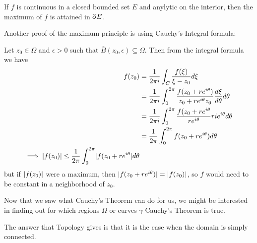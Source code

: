 \begin{corollary}[]
If $f$ is continuous in a closed bounded set $E$ and anylytic on the interior, then the maximum of $f$ is attained in $\partial E$.
\end{corollary}

Another proof of the maximum principle is using Cauchy's Integral formula:

Let $z_0 \in \Omega$ and $\epsilon > 0$ such that $\overline{B}(z_0,\epsilon) \subseteq \Omega$. Then from the integral formula we have
\begin{align*}
	f(z_0) &= \frac{1}{2\pi i}\int_C \frac{f(\xi)}{\xi - z_0}d\xi\\
				 &= \frac{1}{2\pi i} \int_{0}^{2\pi} \frac{f(z_0 + re^{i\theta})}{z_0 + r e^{i\theta} z_0} \frac{d\xi}{d \theta} d \theta \\
				 &=	\frac{1}{2\pi i} \int_{0}^{2\pi} \frac{f(z_0 + re^{i\theta}}{re^{i \theta}} ri e^{i \theta} d \theta \\
				 &= \frac{1}{2\pi} \int_{0}^{2\pi} f(z_0 + re^{i \theta}) d \theta\\
			 \implies \abs{f(z_0)} \leq \frac{1}{2\pi} \int_{0}^{2 \pi} \abs{f(z_0 + re^{i \theta}} d \theta
\end{align*}
but if $\vert f(z_0)\vert$ were a maximum, then $\vert f(z_0 + re^{i \theta})\vert = \vert f(z_0)\vert$, so $f$ would need to be constant in a neighborhood of $z_0$.

Now that we saw what Cauchy's Theorem can do for us, we might be interested in finding out for which regions $\Omega$ or curves $\gamma$ Cauchy's Theorem is true. 

The answer that Topology gives is that it is the case when the domain is simply connected.
